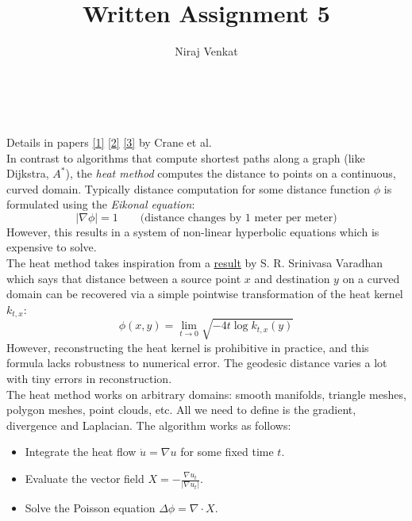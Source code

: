 \documentclass{article}
\newcommand\ifrac[2]{{\displaystyle\frac{#1}{#2}}}
\def\grad{\nabla}
\def\lap{\Delta}
\begin{document}
\title{Written Assignment 5}

\author{Niraj Venkat}

\date{}

\maketitle

\vspace{.8cm}
\\\\


Details in papers \href{http://www.cs.cmu.edu/~kmcrane/Projects/GeodesicsInHeat/paper.pdf}{[1]} 
\href{https://www.cs.cmu.edu/~kmcrane/Projects/HeatMethod/paperTOG.pdf}{[2]}
\href{https://arxiv.org/abs/2007.10430}{[3]}  by Crane et al.\\

In contrast to algorithms that compute shortest paths along a graph (like Dijkstra, $A^*$), the \emph{heat method}
computes the distance to points on a continuous, curved domain. Typically distance computation for some distance function
$\phi$ is formulated using the \emph{Eikonal equation}:
$$
    |\grad \phi| = 1 \quad\quad \text{(distance changes by 1 meter per meter)}
$$
However, this results in a system of non-linear hyperbolic equations which is expensive to solve.\\

The heat method takes inspiration from a \href{http://sci-hub.se/https://doi.org/10.1002/cpa.3160200210}{result}
by S. R. Srinivasa Varadhan which says that distance between a source point $x$ and destination $y$ on a curved domain
can be recovered via a simple pointwise transformation of the heat kernel $k_{t, x}$:
$$
    \phi(x, y) = \lim_{t \rightarrow 0} \sqrt{-4t \log k_{t, x}(y)}
$$
However, reconstructing the heat kernel is prohibitive in practice, and this formula lacks robustness to numerical error.
The geodesic distance varies a lot with tiny errors in reconstruction.\\

The heat method works on arbitrary domains: smooth manifolds, triangle meshes, polygon meshes, point clouds, etc. All we need
to define is the gradient, divergence and Laplacian. The algorithm works as follows:
\begin{itemize}
    \item Integrate the heat flow $\dot{u} = \grad u$ for some fixed time $t$.
    \item Evaluate the vector field $X = -\ifrac{\grad u_t}{|\grad u_t|}$.
    \item Solve the Poisson equation $\lap \phi = \grad \cdot X$.
\end{itemize}
\end{document}
